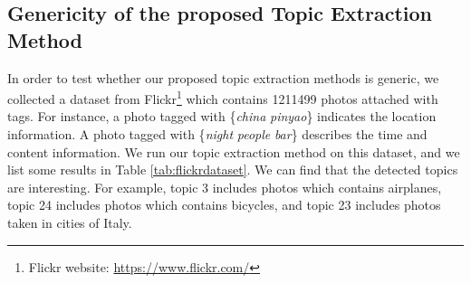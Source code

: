 \subsection{Genericity of the proposed Topic Extraction Method}
In order to test whether our proposed topic extraction methods is generic, we collected a dataset from Flickr\footnote{Flickr website: \url{https://www.flickr.com/} } which contains 1211499 photos attached with tags. For instance, a photo tagged with \{\emph{china} \emph{pinyao}\} indicates the location information. A photo tagged with \{\emph{night} \emph{people} \emph{bar}\} describes the time and content information. We run our topic extraction method on this dataset, and we list some results in Table \ref{tab:flickrdataset}. We can find that the detected topics are interesting. For example, topic 3 includes photos which contains airplanes, topic 24 includes photos which contains bicycles, and topic 23 includes photos taken in cities of Italy.
